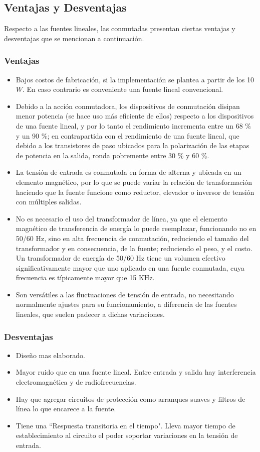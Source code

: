 \documentclass[11pt, a4paper]{article}
\begin{document}
\subsection{Ventajas y Desventajas}
Respecto a las fuentes lineales, las conmutadas presentan ciertas ventajas y desventajas que se mencionan a continuación.
\subsubsection{Ventajas}
\begin{itemize}
	\item Bajos costos de fabricación, si la implementación se plantea a partir de los 10 $W$. En caso contrario es
conveniente una fuente lineal convencional.
	\item Debido a la acción conmutadora, los dispositivos de conmutación disipan menor potencia (se hace uso más
eficiente de ellos) respecto a los dispositivos de una fuente lineal, y por lo tanto el rendimiento incrementa
entre un 68 \% y un 90 \%; en contrapartida con el rendimiento de una fuente lineal, que debido a los
transistores de paso ubicados para la polarización de las etapas de potencia en la salida, ronda pobremente
entre 30 \% y 60 \%.
	\item La tensión de entrada es conmutada en forma de alterna y ubicada en un elemento magnético, por lo que se puede variar la relación de transformación haciendo que la fuente funcione como reductor, elevador o inversor de tensión con múltiples salidas.
	\item No es necesario el uso del transformador de línea, ya que el elemento magnético de transferencia de energía lo puede reemplazar, funcionando no en 50/60 Hz, sino en alta frecuencia de conmutación, reduciendo el tamaño del transformador y en consecuencia, de la fuente; reduciendo el peso, y el costo. Un transformador de energía de 50/60 Hz tiene un volumen efectivo significativamente  mayor que uno aplicado en una fuente conmutada, cuya frecuencia es típicamente mayor que 15 KHz.
	\item Son versátiles a las fluctuaciones de tensión de entrada, no necesitando normalmente ajustes para su
funcionamiento, a diferencia de las fuentes lineales, que suelen padecer a dichas variaciones.
  
\end{itemize}
\subsubsection{Desventajas}
\begin{itemize}
	\item Diseño mas elaborado.
	\item Mayor ruido que en una fuente lineal. Entre entrada y salida hay interferencia electromagnética y de radiofrecuencias.
	\item Hay que agregar circuitos de protección como arranques suaves y filtros de línea lo que encarece a la fuente.
	\item Tiene una ``Respuesta transitoria en el tiempo". Lleva mayor tiempo de establecimiento al circuito el poder soportar variaciones en la tensión de entrada.
\end{itemize}
\end{document}
